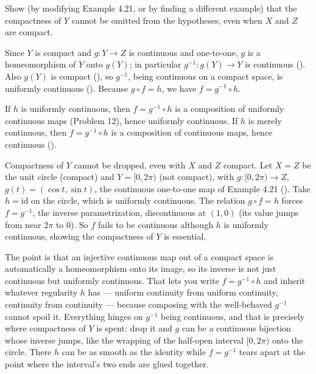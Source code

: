 \documentclass[main.tex]{subfiles}
\begin{document}
Show (by modifying Example 4.21, or by finding a different example) that the compactness of $Y$ cannot be omitted from the hypotheses, even when $X$ and $Z$ are compact.
\begin{SolutionBlue}
Since $Y$ is compact and $g : Y \to Z$ is continuous and one-to-one, $g$ is a homeomorphism of $Y$ onto $g(Y)$; in particular $g^{-1} : g(Y) \to Y$ is continuous (). Also $g(Y)$ is compact (), so $g^{-1}$, being continuous on a compact space, is uniformly continuous (). Because $g \circ f = h$, we have $f = g^{-1} \circ h$.

If $h$ is uniformly continuous, then $f = g^{-1} \circ h$ is a composition of uniformly continuous maps (Problem 12), hence uniformly continuous. If $h$ is merely continuous, then $f = g^{-1} \circ h$ is a composition of continuous maps, hence continuous ().

Compactness of $Y$ cannot be dropped, even with $X$ and $Z$ compact. Let $X = Z$ be the unit circle (compact) and $Y = [0, 2\pi)$ (not compact), with $g : [0, 2\pi) \to Z$, $g(t) = (\cos t, \sin t)$, the continuous one-to-one map of Example 4.21 (). Take $h = \mathrm{id}$ on the circle, which is uniformly continuous. The relation $g \circ f = h$ forces $f = g^{-1}$, the inverse parametrization, discontinuous at $(1, 0)$ (its value jumps from near $2\pi$ to $0$). So $f$ fails to be continuous although $h$ is uniformly continuous, showing the compactness of $Y$ is essential.
\end{SolutionBlue}
\begin{Reflection}
The point is that an injective continuous map out of a compact space is automatically a homeomorphism onto its image, so its inverse is not just continuous but uniformly continuous. That lets you write $f = g^{-1} \circ h$ and inherit whatever regularity $h$ has --- uniform continuity from uniform continuity, continuity from continuity --- because composing with the well-behaved $g^{-1}$ cannot spoil it. Everything hinges on $g^{-1}$ being continuous, and that is precisely where compactness of $Y$ is spent: drop it and $g$ can be a continuous bijection whose inverse jumps, like the wrapping of the half-open interval $[0, 2\pi)$ onto the circle. There $h$ can be as smooth as the identity while $f = g^{-1}$ tears apart at the point where the interval's two ends are glued together.
\end{Reflection}
\end{document}
